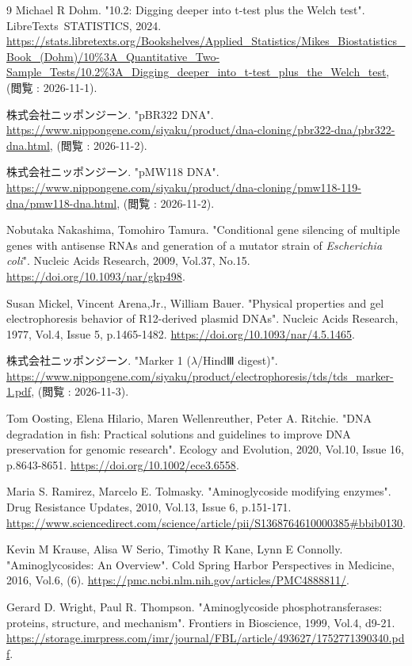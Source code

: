 \documentclass[paper=a4, head_space=20mm, foot_space=25mm]{jlreq}
\begin{document}
    \begin{thebibliography}{9}
         Michael R Dohm. "10.2: Digging deeper into t-test plus the Welch test". LibreTexts\texttrademark \ STATISTICS, 2024. \url{https://stats.libretexts.org/Bookshelves/Applied_Statistics/Mikes_Biostatistics_Book_(Dohm)/10%3A_Quantitative_Two-Sample_Tests/10.2%3A_Digging_deeper_into_t-test_plus_the_Welch_test}, (閲覧 : 2026-11-1).

         株式会社ニッポンジーン. "pBR322 DNA". \url{https://www.nippongene.com/siyaku/product/dna-cloning/pbr322-dna/pbr322-dna.html}, (閲覧 : 2026-11-2).

         株式会社ニッポンジーン. "pMW118 DNA". \url{https://www.nippongene.com/siyaku/product/dna-cloning/pmw118-119-dna/pmw118-dna.html}, (閲覧 : 2026-11-2).

         Nobutaka Nakashima, Tomohiro Tamura. "Conditional gene silencing of multiple genes with antisense RNAs and generation of a mutator strain of \textit{Escherichia coli}". Nucleic Acids Research, 2009, Vol.37, No.15. \url{https://doi.org/10.1093/nar/gkp498}.

         Susan Mickel, Vincent Arena,Jr., William Bauer. "Physical properties and gel electrophoresis behavior of R12-derived plasmid DNAs". Nucleic Acids Research, 1977, Vol.4, Issue 5, p.1465-1482. \url{https://doi.org/10.1093/nar/4.5.1465}.

         株式会社ニッポンジーン. "Marker 1 ($\lambda$/HindⅢ digest)". \url{https://www.nippongene.com/siyaku/product/electrophoresis/tds/tds_marker-1.pdf}, (閲覧 : 2026-11-3).

         Tom Oosting, Elena Hilario, Maren Wellenreuther, Peter A. Ritchie. "DNA degradation in fish: Practical solutions and guidelines to improve DNA preservation for genomic research". Ecology and Evolution, 2020, Vol.10, Issue 16, p.8643-8651. \url{https://doi.org/10.1002/ece3.6558}.

         Maria S. Ramirez, Marcelo E. Tolmasky. "Aminoglycoside modifying enzymes". Drug Resistance Updates, 2010, Vol.13, Issue 6, p.151-171. \url{https://www.sciencedirect.com/science/article/pii/S1368764610000385#bbib0130}.

         Kevin M Krause, Alisa W Serio, Timothy R Kane, Lynn E Connolly. "Aminoglycosides: An Overview". Cold Spring Harbor Perspectives in Medicine, 2016, Vol.6, (6). \url{https://pmc.ncbi.nlm.nih.gov/articles/PMC4888811/}.

         Gerard D. Wright, Paul R. Thompson. "Aminoglycoside phosphotransferases: proteins, structure, and mechanism". Frontiers in Bioscience, 1999, Vol.4, d9-21. \url{https://storage.imrpress.com/imr/journal/FBL/article/493627/1752771390340.pdf}.
    \end{thebibliography}
\end{document}
